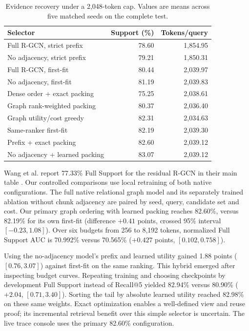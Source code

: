 \documentclass[conference]{IEEEtran}
\begin{document}
\begin{table}[t]
\caption{Evidence recovery under a 2,048-token cap. Values are means across five matched seeds on the complete test.}
\centering\small
\begin{tabular}{lrr}\toprule
Selector & Support (\%) & Tokens/query\\\midrule
Full R-GCN, strict prefix & 78.60 & 1,854.95\\
No adjacency, strict prefix & 79.21 & 1,850.31\\
Full R-GCN, first-fit & 80.44 & 2,039.97\\
No adjacency, first-fit & 81.19 & 2,039.83\\\midrule
Dense order + exact packing & 75.25 & 2,038.61\\
Graph rank-weighted packing & 80.37 & 2,036.40\\
Graph utility/cost greedy & 82.31 & 2,034.63\\
Same-ranker first-fit & 82.19 & 2,039.30\\
Prefix + exact packing & 82.60 & 2,039.12\\
No adjacency + learned packing & 83.07 & 2,039.12\\
\bottomrule\end{tabular}
\label{tab:retrieval}
\end{table}

Wang et al. report 77.33\% Full Support for the residual R-GCN in their main table \cite{wang}. Our controlled comparisons use local retraining of both native configurations. The full native relational graph model and its separately trained ablation without chunk adjacency are paired by seed, query, candidate set and cost. Our primary graph ordering with learned packing reaches 82.60\%, versus 82.19\% for its own first-fit (difference $+0.41$ points, crossed 95\% interval $[-0.23,1.08]$). Over six budgets from 256 to 8,192 tokens, normalized Full Support AUC is 70.992\% versus 70.565\% ($+0.427$ points, $[0.102,0.758]$).

Using the no-adjacency model's prefix and learned utility gained 1.88 points ($[0.76,3.07]$) against first-fit on the same ranking. This hybrid emerged after inspecting budget curves. Repeating training and choosing checkpoints by development Full Support instead of Recall@5 yielded 82.94\% versus 80.90\% ($+2.04$, $[0.71,3.40]$). Sorting the tail by absolute learned utility reached 82.98\% on these same weights. Exact optimization enables a well-defined view and reuse proof; its incremental retrieval benefit over this simple selector is uncertain. The live trace console uses the primary 82.60\% configuration.
\end{document}
